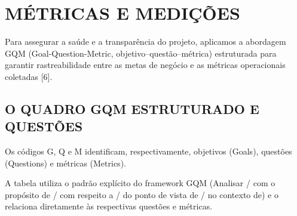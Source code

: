 \clearpage
\section{MÉTRICAS E MEDIÇÕES}

Para assegurar a saúde e a transparência do projeto, aplicamos a abordagem GQM (Goal-Question-Metric, objetivo--questão--métrica) estruturada para garantir rastreabilidade entre as metas de negócio e as métricas operacionais coletadas [6].

\subsection{O QUADRO GQM ESTRUTURADO E QUESTÕES}

Os códigos G, Q e M identificam, respectivamente, objetivos (Goals), questões (Questions) e métricas (Metrics).

A tabela utiliza o padrão explícito do framework GQM (Analisar / com o propósito de / com respeito a / do ponto de vista de / no contexto de) e o relaciona diretamente às respectivas questões e métricas.

